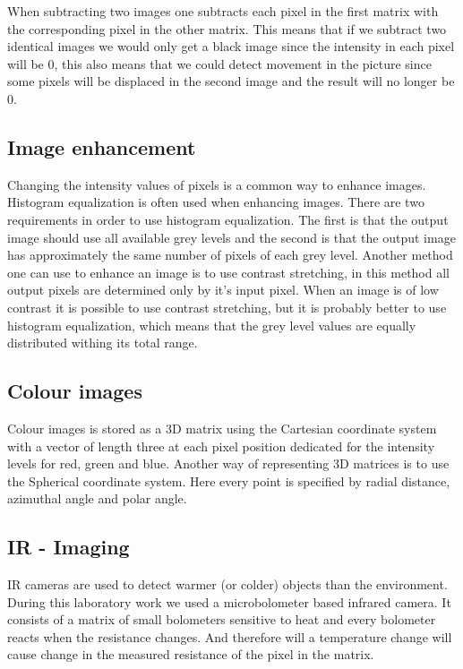 When subtracting two images one subtracts each pixel in the first matrix with the corresponding pixel in the other matrix. \cite{pix-sub} %
This means that if we subtract two identical images we would only get a black image since the intensity in each pixel will be 0, this also means that we could detect movement in the picture since some pixels will be displaced in the second image and the result will no longer be 0.

\subsection{Image enhancement}
Changing the intensity values of pixels is a common way to enhance images. Histogram equalization is often used when enhancing images. There are two requirements in order to use histogram equalization. The first is that the output image should use all available grey levels and the second is that the output image has approximately the same number of pixels of each grey level. Another method one can use to enhance an image is to use contrast stretching, in this method all output pixels are determined only by it's input pixel. \cite{enhanc-img} When an image is of low contrast it is possible to use contrast stretching, but it is probably better to use histogram equalization, which means that the grey level values are equally distributed withing its total range. 

\subsection{Colour images}
Colour images is stored as a 3D matrix using the Cartesian coordinate system with a vector of length three at each pixel position dedicated for the intensity levels for red, green and blue. Another way of representing 3D matrices is to use the Spherical coordinate system. Here every point is specified by radial distance, azimuthal angle and polar angle.

\subsection{IR - Imaging}
IR cameras are used to detect warmer (or colder) objects than the environment. During this laboratory work we used a microbolometer based infrared camera. It consists of a matrix of small bolometers sensitive to heat and every bolometer reacts when the resistance changes. And therefore will a temperature change will cause change in the measured resistance of the pixel in the matrix.
